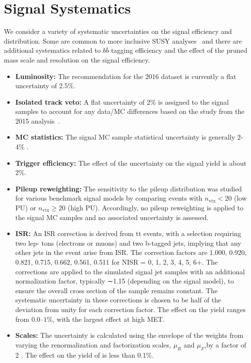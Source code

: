 \section{Signal Systematics}
\label{sec:signalsys}
We consider a variety of systematic uncertainties on the signal efficiency and distribution. Some are common to more 
inclusive SUSY analyses~\cite{RA2b:Moriond} and there are additional systematics related to $b\bar{b}$ tagging efficiency and 
the effect of the pruned mass scale and resolution on the signal efficiency.  
\begin{itemize}
\item {\bf Luminosity:} The recommendation for the 2016 dataset is currently a flat uncertainty of 2.5\%.
\item {\bf Isolated track veto:} A flat uncertainty of 2\% is assigned to the signal samples to account for any data/MC differences based on the study from the 2015 analysis~\cite{RA2b:Moriond}.
\item {\bf MC statistics:} The signal MC sample statistical uncertainty is generally 2-4\% .
\item {\bf Trigger efficiency:} The effect of the uncertainty on the signal yield is about 2\%.
\item {\bf Pileup reweighting:} The sensitivity to the pileup distribution was studied for various benchmark signal models by comparing events with $n_{\textrm{vtx}} < 20$ (low PU) or $n_{\textrm{vtx}} \geq 20$ (high PU). Accordingly, no pileup reweighting is applied to the signal MC samples and no associated uncertainty is assessed.
\item {\bf ISR:} An ISR correction is derived from tt events, with a selection requiring two lep-
tons (electrons or muons) and two b-tagged jets, implying that any other jets in the
event arise from ISR. The correction factors are 1.000, 0.920, 0.821, 0.715, 0.662, 0.561,
0.511 for NISR = 0, 1, 2, 3, 4, 5, 6+. The corrections are applied to the simulated signal jet
samples with an additional normalization factor, typically ∼1.15 (depending on the signal model), to ensure the overall cross section of the sample remains constant. The systematic uncertainty in these corrections is chosen to be half of the deviation from unity for each correction factor. The effect on the yield ranges from $0.0–1\%$, with the largest effect at high MET.
\item {\bf Scales:} The uncertainty is calculated using the envelope of the weights from varying the renormalization and factorization scales, $\mu_{R}$ and $\mu_{F}$,by a factor of 2 \cite{Cacciari:2003fi,Catani:2003zt}. The effect on the yield of is less than 0.1\%.

\end{itemize}
